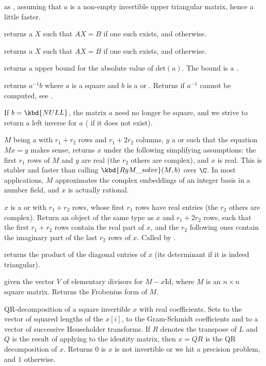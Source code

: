  as , assuming that $a$ is a
non-empty invertible upper triangular matrix, hence a little faster.

 returns a  $X$ such that
$A X = B$ if one such exists, and  otherwise.

 returns a  $X$ such that
$A X = B$ if one such exists, and  otherwise.

 returns a upper bound for the absolute
value of $\text{det}(a)$. The bound is a .

 returns $a^{-1}b$ where $a$ is a square
 and $b$ is a  or . Returns  if $a^{-1}$
cannot be computed, see .

If $b = \kbd{NULL}$, the matrix $a$ need no longer be square, and we strive
to return a left inverse for $a$ ( if it does not exist).

 $M$ being a 
with $r_1+r_2$ rows and $r_1+2r_2$ columns, $y$ a  or 
such that the equation $Mx = y$ makes sense, returns $x$ under the following
simplifying assumptions: the first $r_1$ rows of $M$ and $y$ are real
(the $r_2$ others are complex), and $x$ is real. This is stabler and faster
than calling $\kbd{RgM\_solve}(M, b)$ over $\C$. In most applications,
$M$ approximates the complex embeddings of an integer basis in a number
field, and $x$ is actually rational.

 $x$ is a  or
 with $r_1 + r_2$ rows, whose first $r_1$ rows have real entries
(the $r_2$ others are complex). Return an object of the same type as
$x$ and $r_1 + 2r_2$ rows, such that the first $r_1 + r_2$ rows contain
the real part of $x$, and the $r_2$ following ones contain the imaginary part
of the last $r_2$ rows of $x$. Called by .

 returns the product of the diagonal
entries of $x$ (its determinant if it is indeed triangular).

 given the vector $V$ of elementary
divisors for $M - x\text{Id}$, where $M$ is an $n\times n$ square matrix.
Returns the Frobenius form of $M$.

QR-decomposition of a square invertible  $x$ with real coefficients.
Sets  to the vector of squared lengths of the $x[i]$,  to
the Gram-Schmidt coefficients and  to a vector of successive
Householder transforms. If $R$ denotes the transpose of $L$ and $Q$ is the
result of applying  to the identity matrix, then $x = QR$ is the QR
decomposition of $x$. Returns $0$ is $x$ is not invertible or we hit a
precision problem, and $1$ otherwise.

